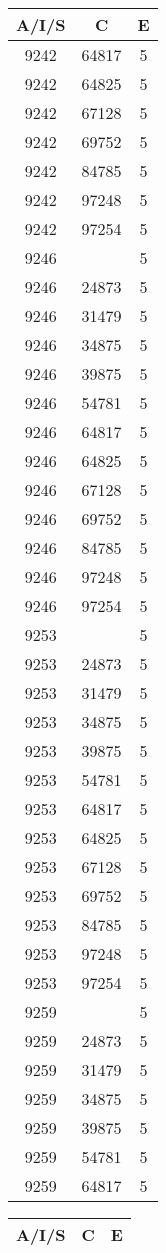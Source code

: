 {{\begin{tabular}{|c|c||c|}
        \hline
        \bf A/I/S & \bf C & \bf E \\
        \hline
9242&64817&5\\ 9242&64825&5\\ 9242&67128&5\\ 9242&69752&5\\ 9242&84785&5\\ 9242&97248&5\\ 9242&97254&5\\ 9246& &5\\ 9246&24873&5\\ 9246&31479&5\\ 9246&34875&5\\ 9246&39875&5\\ 9246&54781&5\\ 9246&64817&5\\ 9246&64825&5\\ 9246&67128&5\\ 9246&69752&5\\ 9246&84785&5\\ 9246&97248&5\\ 9246&97254&5\\ 9253& &5\\ 9253&24873&5\\ 9253&31479&5\\ 9253&34875&5\\ 9253&39875&5\\ 9253&54781&5\\ 9253&64817&5\\ 9253&64825&5\\ 9253&67128&5\\ 9253&69752&5\\ 9253&84785&5\\ 9253&97248&5\\ 9253&97254&5\\ 9259& &5\\ 9259&24873&5\\ 9259&31479&5\\ 9259&34875&5\\ 9259&39875&5\\ 9259&54781&5\\ 9259&64817&5\\ 
        \hline
        \end{tabular}
        \quad
        \begin{tabular}{|c|c||c|}
        \hline
        \bf A/I/S & \bf C & \bf E \\
        \hline

\end{tabular}}}

